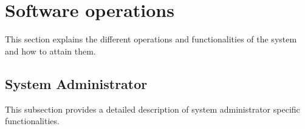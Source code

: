 \documentclass[graybox,envcountchap,sectrefs]{./../lu.uni.lassy.excalibur.standard.report.libraries/styles/svmono}
\begin{document}
 
 


 


\maketitle
\newpage

\setcounter{tocdepth}{2}
\addtocounter{secnumdepth}{2}
\tableofcontents
\newpage

\listoffigures
\newpage




\newpage


\newpage





\newpage

\chapter{Software operations}
\label{chap:soptware_operations}

This section explains the different operations and functionalities of the system
and how to attain them.

\section{System Administrator}
\label{operation:System Administrator}

This subsection provides a detailed description of system administrator specific functionalities.


\end{document}
